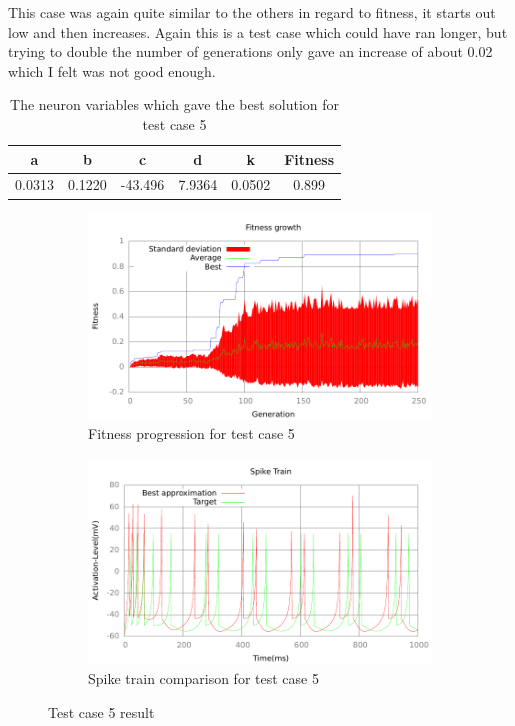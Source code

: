 This case was again quite similar to the others in regard to fitness, it starts
out low and then increases. Again this is a test case which could have ran
longer, but trying to double the number of generations only gave an increase of
about 0.02 which I felt was not good enough.
\begin{table}
	\begin{tabular}{c c c c c c}
		a & b & c & d & k & Fitness\\
		\hline
		0.0313 & 0.1220 & -43.496 & 7.9364 & 0.0502 & 0.899
	\end{tabular}
	\caption{The neuron variables which gave the best solution for test case
	5}
\end{table}
\begin{figure}[h]
	\centering
	\begin{subfigure}[b]{0.5\textwidth}
		\includegraphics[width=\textwidth]{../output/sidm_izzy_2_fitness.pdf}
		\caption{Fitness progression for test case 5}
		\label{fig:fitness-test-case-5}
	\end{subfigure}%
	\begin{subfigure}[b]{0.5\textwidth}
		\includegraphics[width=\textwidth]{../output/sidm_izzy_2_spike.pdf}
		\caption{Spike train comparison for test case 5}
		\label{fig:spike-test-case-5}
	\end{subfigure}
	\caption{Test case 5 result}
\end{figure}

